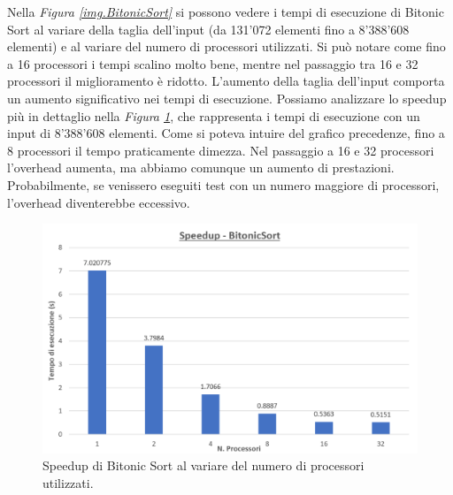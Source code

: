 Nella \textit{Figura \ref{img.BitonicSort}} si possono vedere i tempi di esecuzione di Bitonic Sort al variare della taglia dell'input (da 131'072 elementi fino a 8'388'608 elementi) e al variare del numero di processori utilizzati. Si può notare come fino a 16 processori i tempi scalino molto bene, mentre nel passaggio tra 16 e 32 processori il miglioramento è ridotto. L'aumento della taglia dell'input comporta un aumento significativo nei tempi di esecuzione.
Possiamo analizzare lo speedup più in dettaglio nella \textit{Figura \ref{img.SpeedupBitonic}}, che rappresenta i tempi di esecuzione con un input di 8'388'608 elementi. Come si poteva intuire del grafico precedenze, fino a 8 processori il tempo praticamente dimezza. Nel passaggio a 16 e 32 processori l'overhead aumenta, ma abbiamo comunque un aumento di prestazioni. Probabilmente, se venissero eseguiti test con un numero maggiore di processori, l'overhead diventerebbe eccessivo.
\begin{figure}
\centering
\includegraphics[scale=0.35]{images/SpeedupBitonic}
\caption{\footnotesize{Speedup di Bitonic Sort al variare del numero di processori utilizzati.}}\label{img.SpeedupBitonic}
\end{figure}

